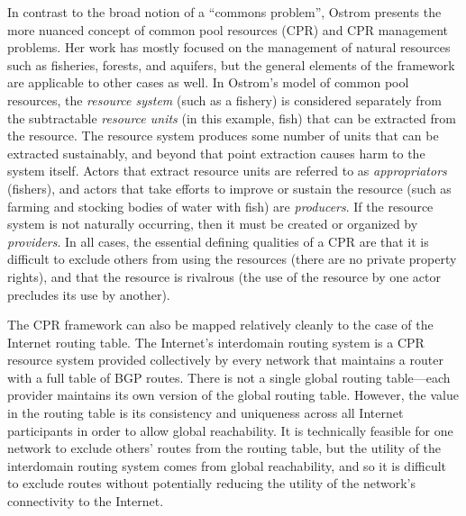 
In contrast to the broad notion of a ``commons problem'', Ostrom
\cite{Ostrom:1990fv} presents the more nuanced concept of common pool resources
(CPR) and CPR management problems. Her work has mostly focused on the
management of natural resources such as fisheries, forests, and aquifers, but
the general elements of the framework are applicable to other cases as well. In
Ostrom's model of common pool resources, the \emph{resource system} (such as a
fishery) is considered separately from the subtractable \emph{resource units}
(in this example, fish) that can be extracted from the resource. The resource
system produces some number of units that can be extracted sustainably, and
beyond that point extraction causes harm to the system itself. Actors that
extract resource units are referred to as \emph{appropriators} (fishers), and
actors that take efforts to improve or sustain the resource (such as farming
and stocking bodies of water with fish) are \emph{producers}. If the resource
system is not naturally occurring, then it must be created or organized by
\emph{providers}. In all cases, the essential defining qualities of a CPR are
that it is difficult to exclude others from using the resources (there are no
private property rights), and that the resource is rivalrous (the use of the
resource by one actor precludes its use by another).

The CPR framework can also be mapped relatively cleanly to the case of the
Internet routing table. The Internet's interdomain routing system is a CPR
resource system provided collectively by every network that maintains a router
with a full table of BGP routes.
There is not a single global routing table---each provider maintains its own
version of the global routing table. However, the value in the routing table is
its consistency and uniqueness across all Internet participants in order to
allow global reachability. It is technically feasible for one network to
exclude others' routes from the routing table, but the utility of the
interdomain routing system comes from global reachability, and so it is
difficult to exclude routes without potentially reducing the utility of the
network's connectivity to the Internet.

